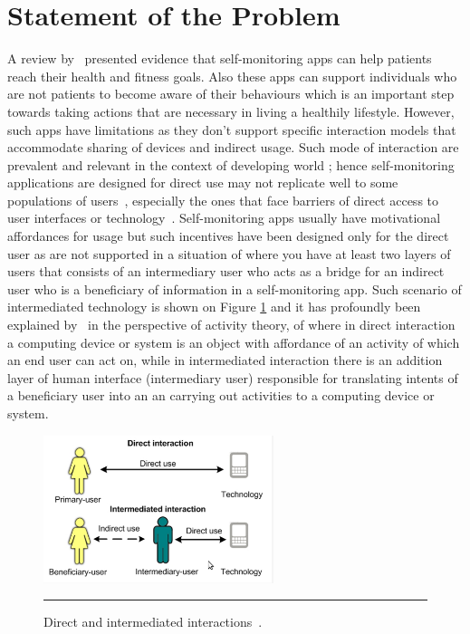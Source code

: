 \section{Statement of the Problem}
A review by~\cite{higgins2016smartphone} presented evidence that self-monitoring apps can help patients reach their health and fitness goals. Also these apps can support individuals who are not patients to become aware of their behaviours which is an important step towards taking actions that are necessary in living a healthily lifestyle. However, such apps have limitations as they don't support specific interaction models that accommodate sharing of devices and indirect usage. Such mode of interaction are prevalent and relevant in the context of developing world ; hence self-monitoring applications are designed for direct use may not replicate well to some populations of users~\citep{kaplan2006can,sambasivan2010}, especially the ones that face barriers of direct access to user interfaces or technology~\citep{kumar2015mobile}. Self-monitoring apps usually have motivational affordances for usage but such incentives have been designed only for the direct user as are not supported in a situation of where you have at least two layers of users that consists of an intermediary user who acts as a bridge for an indirect user who is a beneficiary of information in a self-monitoring app. Such scenario of intermediated technology is shown on Figure \ref{figure:directVSinterm}  and  it has profoundly been explained by~\cite{sambasivan2010} in the perspective of activity theory\citep{kaptelinin1997activity}, of where in direct interaction a computing device or system is an object with affordance of an activity of which an end user can act on, while in intermediated interaction there is an addition layer of human interface (intermediary user) responsible for translating intents of a beneficiary user into an an carrying out activities to a computing device or system.
\begin{figure}[htbp]
  \centering
    \includegraphics[width=0.6\textwidth]{Figures/intermediated.png}
    \rule{35em}{0.5pt}
  \caption{Direct and intermediated interactions~\citep{sambasivan2010}.}
  \label{figure:directVSinterm}
\end{figure}

